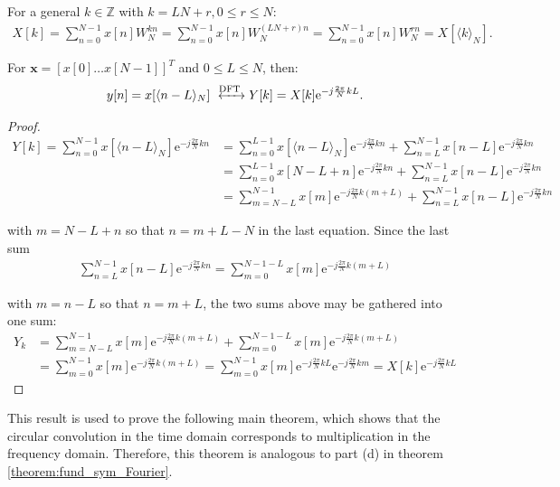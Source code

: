 For a general $k\in\mathbb{Z}$ with $k = LN + r, 0 \leq r \leq N$:
\begin{align*}
X[k] = \sum_{n=0}^{N-1} x[n] W_N^{kn} = \sum_{n=0}^{N-1} x[n] W_N^{(LN+r)n} = \sum_{n=0}^{N-1} x[n] W_N^{rn} = X[\langle k\rangle_N].
\end{align*}

\begin{lemma}
For $\textbf{x} = [x[0] \dots x[N-1]]^T$ and $0 \leq L \leq N$, then:
\begin{align*}
y[n]  = x[\langle n-L\rangle_N] \xleftrightarrow{\text{DFT}} Y[k] = X[k] \text{e}^{-j\frac{2\pi}{N} kL}.
\end{align*}
\end{lemma}

\begin{proof}
\begin{align*}
Y[k] = \sum_{n=0}^{N-1} x[\langle n-L\rangle_N] \text{e}^{-j\frac{2\pi}{N} kn} &= \sum_{n=0}^{L-1} x[\langle n-L\rangle_N]\text{e}^{-j\frac{2\pi}{N} kn} + \sum_{n=L}^{N-1} x[n-L]\text{e}^{-j\frac{2\pi}{N} kn} \\
&= \sum_{n=0}^{L-1} x[N-L+n]\text{e}^{-j\frac{2\pi}{N} kn} + \sum_{n=L}^{N-1} x[n-L]\text{e}^{-j\frac{2\pi}{N} kn} \\
&= \sum_{m=N-L}^{N-1} x[m]\text{e}^{-j\frac{2\pi}{N} k(m+L)} + \sum_{n=L}^{N-1} x[n-L]\text{e}^{-j\frac{2\pi}{N} kn}
\end{align*}

with $m = N - L + n$ so that $n = m + L - N$ in the last equation. Since the last sum
\begin{align*}
\sum_{n=L}^{N-1} x[n-L]\text{e}^{-j\frac{2\pi}{N} kn} = \sum_{m=0}^{N-1-L} x[m] \text{e}^{-j\frac{2\pi}{N}k(m+L)}
\end{align*}

with $m = n - L$ so that $n = m + L$, the two sums above may be gathered into one sum:
\begin{align*}
Y_k &= \sum_{m=N-L}^{N-1} x[m]\text{e}^{-j\frac{2\pi}{N} k(m+L)} + \sum_{m=0}^{N-1-L} x[m] \text{e}^{-j\frac{2\pi}{N}k(m+L)}  \\
&= \sum_{m=0}^{N-1} x[m] \text{e}^{-j\frac{2\pi}{N}k(m+L)} = \sum_{m=0}^{N-1} x[m] \text{e}^{-j\frac{2\pi}{N}kL}\text{e}^{-j\frac{2\pi}{N}km} = X[k] \text{e}^{-j\frac{2\pi}{N}kL}
\end{align*}
\end{proof}

This result is used to prove the following main theorem, which shows that the circular convolution in the time domain corresponds to multiplication in the frequency domain. Therefore, this theorem is analogous to part (d) in theorem \ref{theorem:fund_sym_Fourier}.

